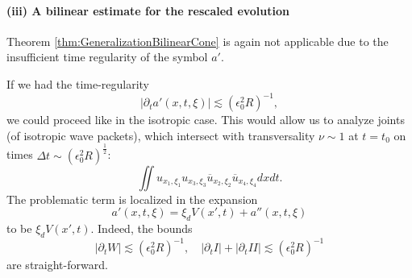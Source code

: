 \documentclass{amsart}
\theoremstyle{definition}
\begin{document}
\paragraph{\textbf{(iii) A bilinear estimate for the rescaled evolution}}

Theorem \ref{thm:GeneralizationBilinearCone} is again not applicable due to the insufficient time regularity of the symbol $a'$.

If we had the time-regularity
\begin{equation*}
|\partial_t a'(x,t,\xi)| \lesssim (\epsilon_0^2 R)^{-1},
\end{equation*}
we could proceed like in the isotropic case.
This would allow us to analyze joints (of isotropic wave packets), which intersect with transversality $\nu \sim 1$ at $t=t_0$ on times $\Delta t \sim (\epsilon_0^2 R)^{\frac{1}{2}}$:
\begin{equation*}
\iint u_{x_1,\xi_1} u_{x_3,\xi_3} \overline{u}_{x_2,\xi_2} \overline{u}_{x_4,\xi_4} dx dt.
\end{equation*}
The problematic term is localized in the expansion
\begin{equation*}
a'(x,t,\xi) = \xi_d V(x',t) + a''(x,t,\xi)
\end{equation*}
to be $\xi_d V(x',t)$. Indeed, the bounds
\begin{equation*}
|\partial_t W| \lesssim (\epsilon_0^2 R)^{-1}, \quad |\partial_t I| + |\partial_t II| \lesssim (\epsilon_0^2 R)^{-1}
\end{equation*}
are straight-forward.
\end{document}
